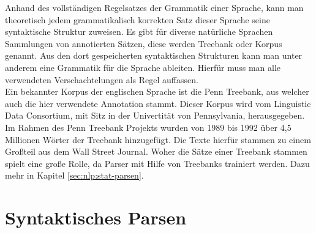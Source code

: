 Anhand des vollständigen Regelsatzes der Grammatik einer Sprache, kann man theoretisch jedem grammatikalisch korrekten Satz dieser Sprache seine syntaktische Struktur zuweisen. Es gibt für diverse natürliche Sprachen Sammlungen von annotierten Sätzen, diese werden Treebank oder Korpus genannt. Aus den dort gespeicherten syntaktischen Strukturen kann man unter anderem eine Grammatik für die Sprache ableiten. Hierfür muss man alle verwendeten Verschachtelungen als Regel auffassen. \\
Ein bekannter Korpus der englischen Sprache ist die Penn Treebank, aus welcher auch die hier verwendete Annotation stammt. Dieser Korpus wird vom Linguistic Data Consortium, mit Sitz in der Univertität von Pennsylvania, herausgegeben. %
Im Rahmen des Penn Treebank Projekts wurden von 1989 bis 1992 über 4,5 Millionen Wörter der Treebank hinzugefügt. Die Texte hierfür stammen zu einem Großteil aus dem Wall Street Journal. Woher die Sätze einer Treebank stammen spielt eine große Rolle, da Parser mit Hilfe von Treebanks trainiert werden. Dazu mehr in Kapitel \ref{sec:nlp:stat-parsen}. %

\section{Syntaktisches Parsen}
\label{sec:nlp:syn-parsen}

